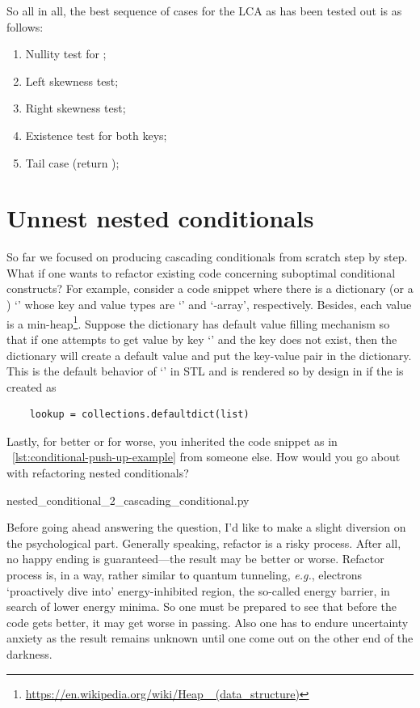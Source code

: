 So all in all, the best sequence of cases for the LCA as has been tested out is as follows:
\begin{enumerate}
    \item Nullity test for ;
    \item Left skewness test;
    \item Right skewness test;
    \item Existence test for both keys;
    \item Tail case (return );
\end{enumerate}

\section{Unnest nested conditionals}\label{sec:unnestnestedconditionals}

So far we focused on producing cascading conditionals from scratch step by step.
What if one wants to refactor existing code concerning suboptimal conditional constructs?
For example, consider a code snippet where there
is a dictionary (or a ) `' whose key and value types are
`' and `-array', respectively.
Besides, each value is a min-heap\footnote{\url{https://en.wikipedia.org/wiki/Heap_
(data_structure)}}.
Suppose the dictionary  has default value filling mechanism so that
if one attempts to get value by key `' and the key does not exist, then the
dictionary will create a default value and put the key-value pair in the dictionary.
This is the default behavior of `' in \cpp STL and
is rendered so by design in \python if the  is created as
\begin{lstlisting}
    lookup = collections.defaultdict(list)
\end{lstlisting}
Lastly, for better or for worse, you inherited the code snippet
as in ~\autoref{lst:conditional-push-up-example} from someone else.
How would you go about with refactoring nested conditionals?
\begin{clisting}[htb]
    
    {nested_conditional_2_cascading_conditional.py}
\end{clisting}


Before going ahead answering the question, I'd like to make a slight diversion on the
psychological part.
Generally speaking, refactor is a risky process.
After all, no happy ending is guaranteed---the result may be better or worse.
Refactor process is, in a way, rather similar to quantum tunneling, \textit{e.g.}, electrons
`proactively dive into' energy-inhibited region, the so-called energy barrier,
in search of lower energy minima.
So one must be prepared to see that before the code gets better, it may get worse in passing.
Also one has to endure uncertainty anxiety as the result remains unknown until one come out on
the other end of the darkness.



